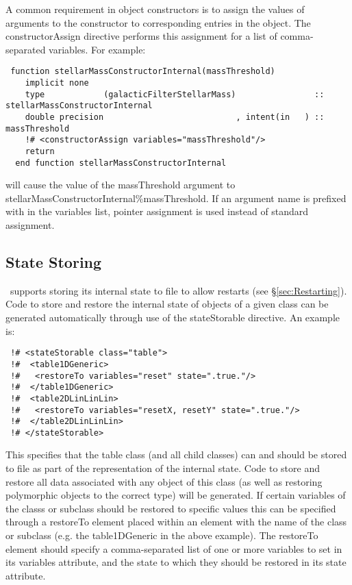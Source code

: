 A common requirement in object constructors is to assign the values of arguments to the constructor to corresponding entries in the object. The {\normalfont \ttfamily constructorAssign} directive performs this assignment for a list of comma-separated variables. For example:
\begin{lstlisting}  
 function stellarMassConstructorInternal(massThreshold)
    implicit none
    type            (galacticFilterStellarMass)                :: stellarMassConstructorInternal
    double precision                           , intent(in   ) :: massThreshold
    !# <constructorAssign variables="massThreshold"/>
    return
  end function stellarMassConstructorInternal
\end{lstlisting}
will cause the value of the {\normalfont \ttfamily massThreshold} argument to {\normalfont \ttfamily stellarMassConstructorInternal\%massThreshold}. If an argument name is prefixed with {\normalfont \ttfamily \textasteriskcentered} in the variables list, pointer assignment is used instead of standard assignment.

\subsection{State Storing}

\glc\ supports storing its internal state to file to allow restarts (see \S\ref{sec:Restarting}). Code to store and restore the internal state of objects of a given class can be generated automatically through use of the {\normalfont \ttfamily stateStorable} directive. An example is:
\begin{verbatim}
 !# <stateStorable class="table">
 !#  <table1DGeneric>
 !#   <restoreTo variables="reset" state=".true."/>
 !#  </table1DGeneric>
 !#  <table2DLinLinLin>
 !#   <restoreTo variables="resetX, resetY" state=".true."/>
 !#  </table2DLinLinLin>  
 !# </stateStorable>
\end{verbatim}
This specifies that the {\normalfont \ttfamily table} class (and all child classes) can and should be stored to file as part of the representation of the internal state. Code to store and restore all data associated with any object of this class (as well as restoring polymorphic objects to the correct type) will be generated. If certain variables of the classs or subclass should be restored to specific values this can be specified through a {\normalfont \ttfamily restoreTo} element placed within an element with the name of the class or subclass (e.g. the {\normalfont \ttfamily table1DGeneric} in the above example). The {\normalfont \ttfamily restoreTo} element should specify a comma-separated list of one or more variables to set in its {\normalfont \ttfamily variables} attribute, and the state to which they should be restored in its {\normalfont \ttfamily state} attribute.

